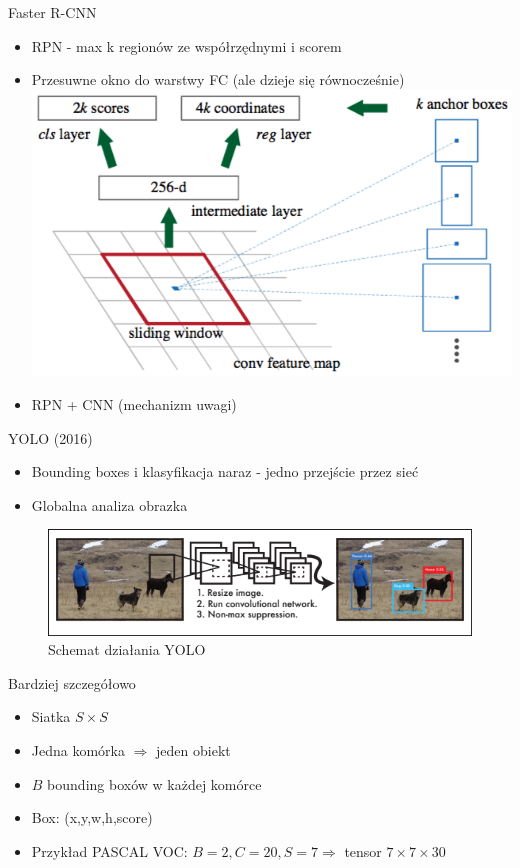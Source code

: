 \documentclass[11pt]{beamer}
\begin{document}
\begin{frame}{Faster R-CNN}

\begin{itemize}
    \item RPN - max k regionów ze współrzędnymi i scorem
    \item Przesuwne okno do warstwy FC (ale dzieje się równocześnie)
    \includegraphics[height=0.6\textheight]{grafika/rpn.png}
    \item RPN + CNN (mechanizm uwagi)
\end{itemize}
    
\end{frame}


\begin{frame}{YOLO (2016)}
\begin{itemize}
    \item Bounding boxes i klasyfikacja naraz - jedno przejście przez sieć
    \item Globalna analiza obrazka
\end{itemize}
\begin{figure}
    \centering
    \includegraphics[width=\textwidth]{grafika/yolo-schemat.png}
    \caption{Schemat działania YOLO}
    \label{fig_yolo_schemat}
\end{figure}
\end{frame}


\begin{frame}{Bardziej szczegółowo}
    \begin{itemize}
        \item Siatka $S\times S$
        \item Jedna komórka $\Rightarrow$ jeden obiekt
        \item $B$ bounding boxów w każdej komórce
        \item Box: (x,y,w,h,score)
        \item Przykład PASCAL VOC: $B=2, C=20, S=7 \Rightarrow$  tensor $7 \times 7 \times 30$ 
    \end{itemize}
\end{frame}
\end{document}
